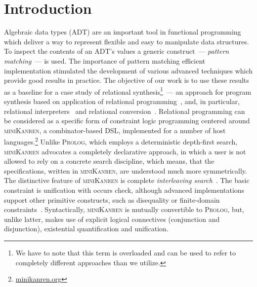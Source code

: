 \section{Introduction}
\label{sec:intro}

Algebraic data types (ADT) are an important tool in functional programming which deliver a way to represent flexible and easy to manipulate data structures.
To inspect the contents of an ADT's values a generic construct~--- \emph{pattern matching}~--- is used. The importance of pattern matching efficient
implementation stimulated the development of various advanced techniques which provide good results in practice. The objective of our work is to use these
results as a baseline for a case study of relational synthesis\footnote{We have to note that this term is overloaded and can be used to refer to completely
different approaches than we utilize.}~--- an approach for program synthesis based on application of relational programming~\cite{TRS,WillThesis}, and,
in particular, relational interpreters~\cite{unified} and relational conversion~\cite{conversion}. Relational programming can be considered as a specific form
of constraint logic programming centered around \textsc{miniKanren}, a combinator-based DSL, implemented for a number of host languages.\footnote{\url{minikanren.org}}
Unlike \textsc{Prolog}, which employs a deterministic depth-first search, \textsc{miniKanren} advocates a completely declarative approach, in which a user is not
allowed to rely on a concrete search discipline, which means, that the specifications, written in \textsc{miniKanren}, are understood much more symmetrically.
The distinctive feature of \textsc{miniKanren} is complete \emph{interleaving search}~\cite{search}. The basic constraint is unification with occurs check, although
advanced implementations support other primitive constructs, such as disequality or finite-domain constraints~\cite{CKanren}. Syntactically, \textsc{miniKanren} is mutually
convertible to \textsc{Prolog}, but, unlike latter, makes use of explicit logical connectives (conjunction and disjunction), existential quantification and unification.

